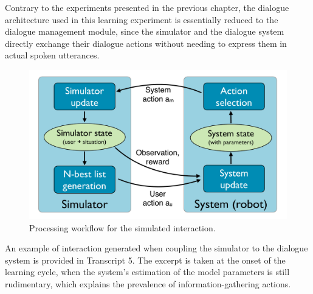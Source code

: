 Contrary to the experiments presented in the previous chapter, the dialogue architecture used in this learning experiment is essentially reduced to the dialogue management module, since the simulator and the dialogue system directly exchange their dialogue actions without needing to express them in actual spoken utterances.   

\begin{figure}[ht]
\begin{center}
\includegraphics[scale=0.3]{imgs/exp2_architecture.pdf}
\end{center} 
\caption{Processing workflow for the simulated interaction.}
\label{fig:exp2_architecture}
\end{figure}

An example of interaction generated when coupling the simulator to the dialogue system is provided in Transcript 5. The excerpt is taken at the onset of the learning cycle, when the system's estimation of the model parameters is still rudimentary, which explains the prevalence of information-gathering actions. 

